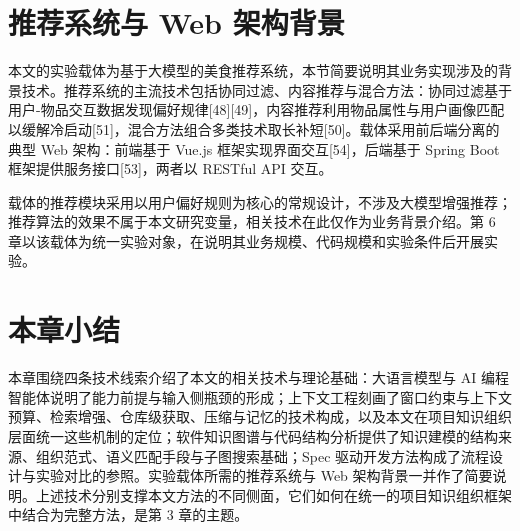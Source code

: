 \section{推荐系统与 Web 架构背景}
本文的实验载体为基于大模型的美食推荐系统，本节简要说明其业务实现涉及的背景技术。推荐系统的主流技术包括协同过滤、内容推荐与混合方法：协同过滤基于用户-物品交互数据发现偏好规律[48][49]，内容推荐利用物品属性与用户画像匹配以缓解冷启动[51]，混合方法组合多类技术取长补短[50]。载体采用前后端分离的典型 Web 架构：前端基于 Vue.js 框架实现界面交互[54]，后端基于 Spring Boot 框架提供服务接口[53]，两者以 RESTful API 交互。

载体的推荐模块采用以用户偏好规则为核心的常规设计，不涉及大模型增强推荐；推荐算法的效果不属于本文研究变量，相关技术在此仅作为业务背景介绍。第 6 章以该载体为统一实验对象，在说明其业务规模、代码规模和实验条件后开展实验。


\section{本章小结}
本章围绕四条技术线索介绍了本文的相关技术与理论基础：大语言模型与 AI 编程智能体说明了能力前提与输入侧瓶颈的形成；上下文工程刻画了窗口约束与上下文预算、检索增强、仓库级获取、压缩与记忆的技术构成，以及本文在项目知识组织层面统一这些机制的定位；软件知识图谱与代码结构分析提供了知识建模的结构来源、组织范式、语义匹配手段与子图搜索基础；Spec 驱动开发方法构成了流程设计与实验对比的参照。实验载体所需的推荐系统与 Web 架构背景一并作了简要说明。上述技术分别支撑本文方法的不同侧面，它们如何在统一的项目知识组织框架中结合为完整方法，是第 3 章的主题。

